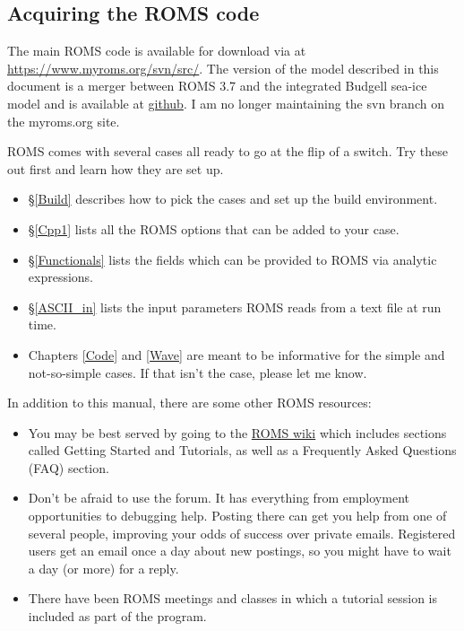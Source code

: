 \subsection{Acquiring the ROMS code}
The main ROMS code is available for download via  at
\url{https://www.myroms.org/svn/src/}. The version of the model
described in this document is a merger between ROMS 3.7 and the
integrated Budgell sea-ice model and is available at
\href{https://github.com/kshedstrom/roms}{github}. I am no longer
maintaining the svn branch on the myroms.org site.

ROMS comes with several cases all ready to go at the flip
of a switch. Try these out first and learn how they are set up.
    \begin{itemize}
      \item \S\ref{Build} describes how to pick the cases and set up
      the build environment.
      \item \S\ref{Cpp1} lists all the ROMS options that can be
      added to your case.
      \item \S\ref{Functionals} lists the fields which can be
      provided to ROMS via analytic expressions.
      \item \S\ref{ASCII_in} lists the input parameters ROMS reads
      from a text file at run time.
      \item Chapters \ref{Code} and \ref{Wave} are meant to be
      informative for the simple and not-so-simple cases. If that
      isn't the case, please let me know.
    \end{itemize}
In addition to this manual, there are some other ROMS resources:
\begin{itemize}
   \item You may be best served by going to the 
\href{https://www.myroms.org/wiki/}{ROMS wiki} which includes
sections called Getting Started and Tutorials, as well as a Frequently
Asked Questions (FAQ) section.
   \item Don't be afraid to use the forum. It has everything from
employment opportunities to debugging help. Posting there can get
you help from one of several people, improving your odds of success
over private emails. Registered users get an email once a day about
new postings, so you might have to wait a day (or more) for a reply.
   \item There have been ROMS meetings and classes in which a tutorial
session is included as part of the program.
\end{itemize}

